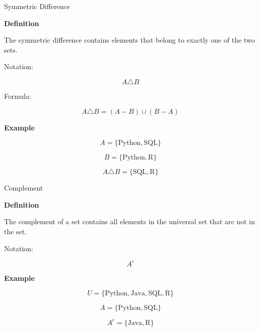 \documentclass{beamer}
\begin{document}
\begin{frame}{Symmetric Difference}

\small

\textbf{Definition}

The symmetric difference contains elements that belong to exactly one of the two sets.

Notation:

\[
A\triangle B
\]

Formula:

\[
A\triangle B=(A-B)\cup(B-A)
\]

\textbf{Example}

\[
A=\{\text{Python},\text{SQL}\}
\]

\[
B=\{\text{Python},\text{R}\}
\]

\[
A\triangle B=
\{\text{SQL},\text{R}\}
\]

\end{frame}

\begin{frame}{Complement}

\small

\textbf{Definition}

The complement of a set contains all elements in the universal set that are not in the set.

Notation:

\[
A^c
\]

\textbf{Example}

\[
U=\{\text{Python},\text{Java},\text{SQL},\text{R}\}
\]

\[
A=\{\text{Python},\text{SQL}\}
\]

\[
A^c=
\{\text{Java},\text{R}\}
\]

\end{frame}
\end{document}

